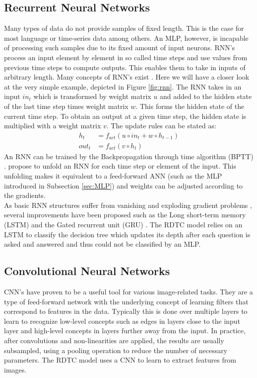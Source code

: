 \documentclass[a4paper,cleardoubleempty,BCOR1cm, 11pt]{report}
\begin{document}
\subsection{Recurrent Neural Networks}
Many types of data do not provide samples of fixed length. This is the case for most language or time-series data among others. An MLP, however, is incapable of processing such samples due to its fixed amount of input neurons. RNN's process an input element by element in so called time steps and use values from previous time steps to compute outputs. This enables them to take in inputs of arbitrary length. Many concepts of RNN's exist \cite{Grossberg:2013}. Here we will have a closer look at the very simple example, depicted in Figure \ref{fig:rnn}.
The  RNN takes in an input $in_t$ which is transformed by weight matrix $u$ and added to the hidden state of the last time step times weight matrix $w$. This forms the hidden state of the current time step. To obtain an output at a given time step, the hidden state is multiplied with a weight matrix $v$. The update rules can be stated as:
\begin{align}
	h_t &= f_{act}(u \circ in_t + w \circ h_{t-1})\\
	out_t &=f_{act}(v \circ h_t)
\end{align}
An RNN can be trained by the Backpropagation through time algorithm (BPTT) \cite{werbos1990backpropagation}. \citet{werbos1990backpropagation} propose to unfold an RNN for each time step or element of the input. This unfolding makes it equivalent to a feed-forward ANN (such as the MLP introduced in Subsection \ref{sec:MLP}) and weights can be adjusted according to the gradients.\\
As basic RNN structures suffer from vanishing and exploding gradient problems \cite{bengio1994learning}, several improvements have been proposed such as the Long short-term memory (LSTM) \cite{hochreiter1997long} and the Gated recurrent unit (GRU) \cite{cho2014learning}.
The RDTC model relies on an LSTM to classify the decision tree which updates its depth after each question is asked and answered and thus could not be classified by an MLP.


\subsection{Convolutional Neural Networks}
CNN's have proven to be a useful tool for various image-related tasks. They are a type of feed-forward network with the underlying concept of learning filters that correspond to features in the data. Typically this is done over multiple layers to learn to recognize low-level concepts such as edges in layers close to the input layer and high-level concepts in layers further away from the input. In practice, after convolutions and non-linearities are applied, the results are usually subsampled, using a pooling operation to reduce the number of necessary parameters. The RDTC model uses a CNN to learn to extract features from images.
\end{document}
